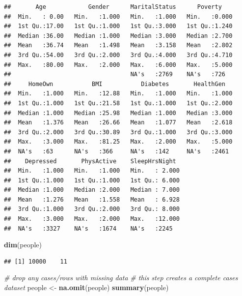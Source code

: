 \documentclass[]{article}
\newenvironment{Shaded}{\begin{snugshade}}{\end{snugshade}}
\newcommand{\KeywordTok}[1]{\textcolor[rgb]{0.13,0.29,0.53}{\textbf{{#1}}}}
\newcommand{\StringTok}[1]{\textcolor[rgb]{0.31,0.60,0.02}{{#1}}}
\newcommand{\CommentTok}[1]{\textcolor[rgb]{0.56,0.35,0.01}{\textit{{#1}}}}
\newcommand{\NormalTok}[1]{{#1}}
\begin{document}
\begin{verbatim}
##       Age            Gender      MaritalStatus      Poverty     
##  Min.   : 0.00   Min.   :1.000   Min.   :1.000   Min.   :0.000  
##  1st Qu.:17.00   1st Qu.:1.000   1st Qu.:3.000   1st Qu.:1.240  
##  Median :36.00   Median :1.000   Median :3.000   Median :2.700  
##  Mean   :36.74   Mean   :1.498   Mean   :3.158   Mean   :2.802  
##  3rd Qu.:54.00   3rd Qu.:2.000   3rd Qu.:4.000   3rd Qu.:4.710  
##  Max.   :80.00   Max.   :2.000   Max.   :6.000   Max.   :5.000  
##                                  NA's   :2769    NA's   :726    
##     HomeOwn           BMI           Diabetes       HealthGen    
##  Min.   :1.000   Min.   :12.88   Min.   :1.000   Min.   :1.000  
##  1st Qu.:1.000   1st Qu.:21.58   1st Qu.:1.000   1st Qu.:2.000  
##  Median :1.000   Median :25.98   Median :1.000   Median :3.000  
##  Mean   :1.376   Mean   :26.66   Mean   :1.077   Mean   :2.618  
##  3rd Qu.:2.000   3rd Qu.:30.89   3rd Qu.:1.000   3rd Qu.:3.000  
##  Max.   :3.000   Max.   :81.25   Max.   :2.000   Max.   :5.000  
##  NA's   :63      NA's   :366     NA's   :142     NA's   :2461   
##    Depressed       PhysActive    SleepHrsNight   
##  Min.   :1.000   Min.   :1.000   Min.   : 2.000  
##  1st Qu.:1.000   1st Qu.:1.000   1st Qu.: 6.000  
##  Median :1.000   Median :2.000   Median : 7.000  
##  Mean   :1.276   Mean   :1.558   Mean   : 6.928  
##  3rd Qu.:1.000   3rd Qu.:2.000   3rd Qu.: 8.000  
##  Max.   :3.000   Max.   :2.000   Max.   :12.000  
##  NA's   :3327    NA's   :1674    NA's   :2245
\end{verbatim}

\begin{Shaded}
\begin{Highlighting}[]
\KeywordTok{dim}\NormalTok{(people)}
\end{Highlighting}
\end{Shaded}

\begin{verbatim}
## [1] 10000    11
\end{verbatim}

\begin{Shaded}
\begin{Highlighting}[]
\CommentTok{# drop any cases/rows with missing data}
\CommentTok{# this step creates a complete cases dataset}
\NormalTok{people <-}\StringTok{ }\KeywordTok{na.omit}\NormalTok{(people)}
\KeywordTok{summary}\NormalTok{(people)}
\end{Highlighting}
\end{Shaded}
\end{document}
